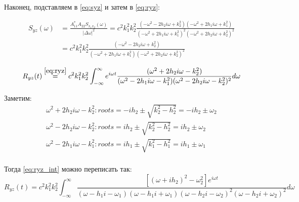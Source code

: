 \documentclass[a4paper,12pt]{article}
\begin{document}
Наконец, подставляем в \eqref{eq:syz} и затем в \eqref{eq:ryz}:

\begin{align*}
    S_{yz}(\omega) & =  \frac{A_{11}^* A_{22} S_{x_1 x_2}(\omega)}{|\Delta \omega|^2} = c^2 k_1^2 k_2^2 \frac{(- \omega^2 - 2 h_2 i \omega + k_2^2)(- \omega^2 + 2 h_1 i \omega + k_1^2)}{(- \omega^2 + 2 h_1 i \omega + k_1^2)^2(- \omega^2 + 2 h_2 i \omega + k_2^2)^2} \\
    & = c^2 k_1^2 k_2^2 \frac{(- \omega^2 - 2 h_2 i \omega + k_2^2)}{(- \omega^2 + 2 h_1 i \omega + k_1^2)(- \omega^2 + 2 h_2 i \omega + k_2^2)^2}
\end{align*}

\begin{equation}
    R_{yz}(t) \overset{\eqref{eq:ryz}}= c^2 k_1^2 k_2^2 \int_{-\infty}^\infty e^{i\omega t} \frac{(\omega^2 + 2 h_2 i \omega - k_2^2)}{(\omega^2 - 2 h_1 i \omega - k_1^2)(\omega^2 - 2 h_2 i \omega - k_2^2)^2} d \omega \label{eq:ryz_int}
\end{equation}

Заметим:
\begin{gather*}
    \omega^2 + 2 h_2 i \omega - k_2^2: roots = -ih_2 \pm \sqrt{k_2^2-h_2^2} = -ih_2 \pm \omega_2 \\
    \omega^2 - 2 h_2 i \omega - k_2^2: roots = ih_2 \pm \sqrt{k_2^2-h_2^2} = ih_2 \pm \omega_2 \\
    \omega^2 - 2 h_1 i \omega - k_1^2: roots = ih_1 \pm \sqrt{k_1^2-h_1^2} = ih_1 \pm \omega_1 \\
\end{gather*}

Тогда \eqref{eq:ryz_int} можно переписать так:
\[ R_{yz}(t) = c^2 k_1^2 k_2^2 \int_{-\infty}^\infty \frac{[(\omega + ih_2)^2 - \omega_2^2] e^{i\omega t}}{(\omega - h_1 i - \omega_1)(\omega - h_1 i + \omega_1)(\omega - h_2 i - \omega_2)^2 (\omega - h_2 i + \omega_2)^2} d \omega \]
\end{document}
